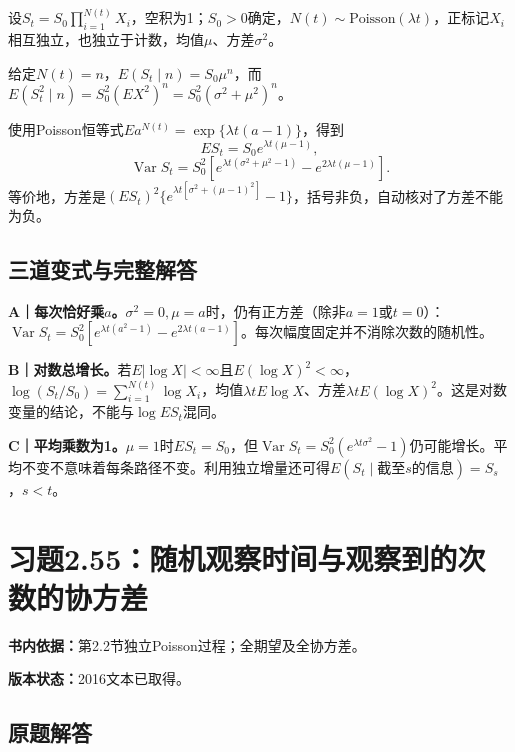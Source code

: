 \documentclass[
  11pt,
  a4paper,
  UTF8,fontset=fandol]{ctexart}
\let\OldSection\section
\renewcommand{\section}{\Needspace{7\baselineskip}\OldSection}
\let\OldSubsection\subsection
\renewcommand{\subsection}{\Needspace{5\baselineskip}\OldSubsection}
\begin{document}
设\(S_t=S_0\prod_{i=1}^{N(t)}X_i\)，空积为1；\(S_0>0\)确定，\(N(t)\sim\mathrm{Poisson}(\lambda t)\)，正标记\(X_i\)相互独立，也独立于计数，均值\(\mu\)、方差\(\sigma^2\)。

给定\(N(t)=n\)，\(E(S_t\mid n)=S_0\mu^n\)，而\(E(S_t^2\mid n)=S_0^2(EX^2)^n=S_0^2(\sigma^2+\mu^2)^n\)。

使用Poisson恒等式\(E a^{N(t)}=\exp\{\lambda t(a-1)\}\)，得到
\[\boxed{ES_t=S_0e^{\lambda t(\mu-1)}},\]
\[\boxed{\operatorname{Var}S_t=S_0^2\left[e^{\lambda t(\sigma^2+\mu^2-1)}-e^{2\lambda t(\mu-1)}\right].}\]
等价地，方差是\((ES_t)^2\{e^{\lambda t[\sigma^2+(\mu-1)^2]}-1\}\)，括号非负，自动核对了方差不能为负。

\subsection{三道变式与完整解答}\label{ux4e09ux9053ux53d8ux5f0fux4e0eux5b8cux6574ux89e3ux7b54-53}

\textbf{A｜每次恰好乘\(a\)。}\(\sigma^2=0,\mu=a\)时，仍有正方差（除非\(a=1\)或\(t=0\)）：\(\operatorname{Var}S_t=S_0^2[e^{\lambda t(a^2-1)}-e^{2\lambda t(a-1)}]\)。每次幅度固定并不消除次数的随机性。

\textbf{B｜对数总增长。}若\(E|\log X|<\infty\)且\(E(\log X)^2<\infty\)，\(\log(S_t/S_0)=\sum_{i=1}^{N(t)}\log X_i\)，均值\(\lambda t E\log X\)、方差\(\lambda t E(\log X)^2\)。这是对数变量的结论，不能与\(\log ES_t\)混同。

\textbf{C｜平均乘数为1。}\(\mu=1\)时\(ES_t=S_0\)，但\(\operatorname{Var}S_t=S_0^2(e^{\lambda t\sigma^2}-1)\)仍可能增长。平均不变不意味着每条路径不变。利用独立增量还可得\(E(S_t\mid\text{截至}s\text{的信息})=S_s\)，\(s<t\)。

\newpage

\section{习题2.55：随机观察时间与观察到的次数的协方差}\label{ux4e60ux98982.55ux968fux673aux89c2ux5bdfux65f6ux95f4ux4e0eux89c2ux5bdfux5230ux7684ux6b21ux6570ux7684ux534fux65b9ux5dee}

\textbf{书内依据：}第2.2节独立Poisson过程；全期望及全协方差。

\textbf{版本状态：}2016文本已取得。

\subsection{原题解答}\label{ux539fux9898ux89e3ux7b54-54}
\end{document}
